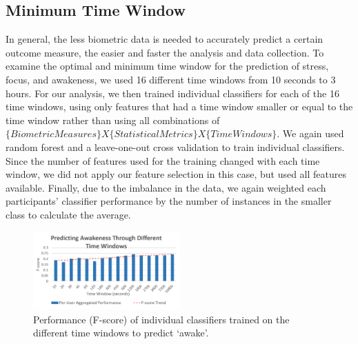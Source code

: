 \subsection{Minimum Time Window}\label{secMinimumTW}
In general, the less biometric data is needed to accurately predict a certain outcome measure, the easier and faster the analysis and data collection. To examine the optimal and minimum time window for the prediction of stress, focus, and awakeness, we used 16 different time windows from 10 seconds to 3 hours.%
For our analysis, we then trained individual classifiers for each of the 16 time windows, using only features that had a time window smaller or equal to the time window rather than using all combinations of \small{$\{Biometric Measures\} X \{Statistical Metrics\} X \{Time Windows\}$}. We again used random forest and a leave-one-out cross validation to train individual classifiers. Since the number of features used for the training changed with each time window, we did not apply our feature selection in this case, but used all features available. Finally, due to the imbalance in the data, we again weighted each participants' classifier performance by the number of instances in the smaller class to calculate the average.




\begin{figure}
  \centering
      \includegraphics[width=0.5\textwidth]{20180912AwakenessTWBars.png}
  \caption{Performance (F-score) of individual classifiers trained on the different time windows to predict `awake'.}
  \label{timeWindowsPandR}
  \vspace*{-3mm}
\end{figure}

